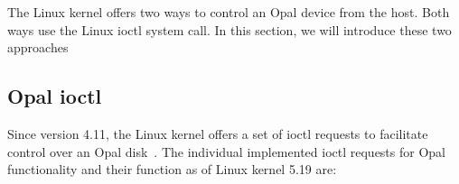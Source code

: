 The Linux kernel offers two ways to control an Opal device from the host. Both ways use the Linux ioctl system call. In this section, we will introduce these two approaches


\subsection{Opal ioctl}

Since version 4.11, the Linux kernel offers a set of ioctl requests to facilitate control over an Opal disk~\cite{linux-opal-introduction-mail}. 
The individual implemented ioctl requests for Opal functionality and their function as of Linux kernel 5.19 are:
